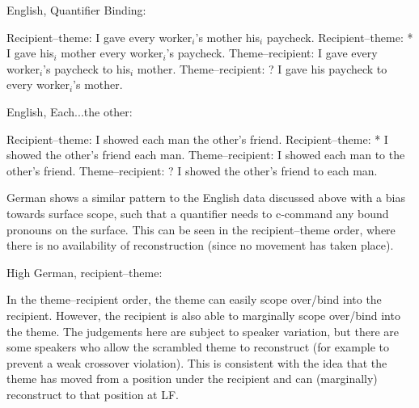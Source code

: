 \begin{exe}
	\ex English, Quantifier Binding:\label{ex:en-qb}
\begin{xlist}
\ex Recipient--theme: I gave every worker$_i$'s mother his$_i$ paycheck.
\ex Recipient--theme: * I gave his$_i$ mother every worker$_i$'s paycheck.
\ex Theme--recipient: I gave every worker$_i$'s paycheck to his$_i$ mother.
\ex Theme--recipient: ? I gave his paycheck to every worker$_i$'s mother.
\end{xlist}

\ex English, Each...the other:\label{ex:en-eachother}
\begin{xlist}
\ex Recipient--theme: I showed each man the other's friend.
\ex Recipient--theme: * I showed the other's friend each man.
\ex Theme--recipient: I showed each man to the other's friend.
\ex Theme--recipient: ? I showed the other's friend to each man.
\end{xlist}
\end{exe}

German shows a similar pattern to the English data discussed above with a bias towards surface scope, such that a quantifier needs to c-command any bound pronouns on the surface. This can be seen in the recipient--theme order, where there is no availability of reconstruction (since no movement has taken place).

\begin{exe}
	\ex High German, recipient--theme:\label{ex:hg-binding-rt}
\begin{xlist}
\end{xlist}
\end{exe}

In the theme--recipient order, the theme can easily scope over/bind into the recipient. However, the recipient is also able to marginally scope over/bind into the theme. The judgements here are subject to speaker variation, but there are some speakers who allow the scrambled theme to reconstruct (for example to prevent a weak crossover violation). This is consistent with the idea that the theme has moved from a position under the recipient and can (marginally) reconstruct to that position at LF.

